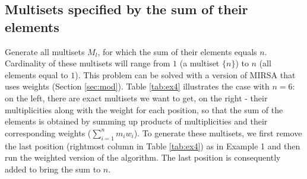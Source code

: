 \documentclass[12pt]{article}
\begin{document}
\subsection{Multisets specified by the sum of their elements}

Generate all multisets $M_l$, for which the sum of their elements equals $n$. Cardinality of these multisets will range from $1$ (a multiset $\{n\}$) to $n$ (all elements equal to $1$). This problem can be solved with a version of MIRSA that uses weights (Section \ref{sec:mod}). Table \ref{tab:ex4} illustrates the case with $n = 6$: on the left, there are exact multisets we want to get, on the right - their multiplicities along with the weight for each position, so that the sum of the elements is obtained by summing up products of multiplicities and their corresponding weights ($\sum_{i = 1}^n m_i w_i$). To generate these multisets, we first remove the last position (rightmost column in Table \ref{tab:ex4}) as in Example 1 and then run the weighted version of the algorithm. The last position is consequently added to bring the sum to $n$. 
\end{document}
